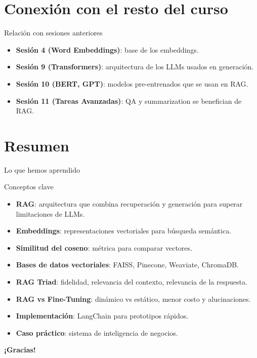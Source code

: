 \documentclass[aspectratio=169, 10pt, xcolor=table]{beamer}
\begin{document}
\section{Conexi\'on con el resto del curso}

\begin{frame}{Relaci\'on con sesiones anteriores}
    \begin{itemize}
        \item \textbf{Sesi\'on 4 (Word Embeddings)}: base de los embeddings.
        \item \textbf{Sesi\'on 9 (Transformers)}: arquitectura de los LLMs usados en generaci\'on.
        \item \textbf{Sesi\'on 10 (BERT, GPT)}: modelos pre-entrenados que se usan en RAG.
        \item \textbf{Sesi\'on 11 (Tareas Avanzadas)}: QA y summarization se benefician de RAG.
    \end{itemize}
\end{frame}

\section{Resumen}

\begin{frame}{Lo que hemos aprendido}
    \begin{exampleblock}{Conceptos clave}
        \begin{itemize}
            \item \textbf{RAG}: arquitectura que combina recuperaci\'on y generaci\'on para superar limitaciones de LLMs.
            \item \textbf{Embeddings}: representaciones vectoriales para b\'usqueda sem\'antica.
            \item \textbf{Similitud del coseno}: m\'etrica para comparar vectores.
            \item \textbf{Bases de datos vectoriales}: FAISS, Pinecone, Weaviate, ChromaDB.
            \item \textbf{RAG Triad}: fidelidad, relevancia del contexto, relevancia de la respuesta.
            \item \textbf{RAG vs Fine-Tuning}: din\'amico vs est\'atico, menor costo y alucinaciones.
            \item \textbf{Implementaci\'on}: LangChain para prototipos r\'apidos.
            \item \textbf{Caso pr\'actico}: sistema de inteligencia de negocios.
        \end{itemize}
    \end{exampleblock}
\end{frame}

\begin{frame}
    \centering
    \Huge \textbf{¡Gracias!}

\end{frame}
\end{document}
